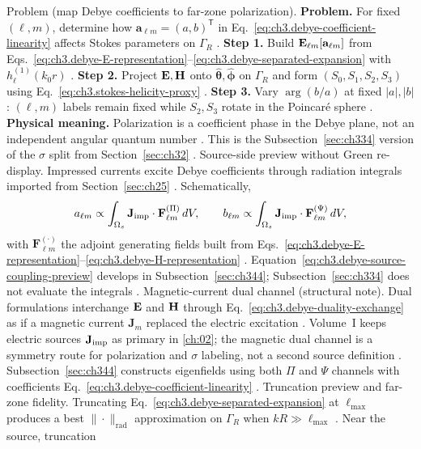 Problem (map Debye coefficients to far-zone polarization). \textbf{Problem.} For fixed \((\ell,m)\), determine how \(\mathbf{a}_{\ell m}=(a,b)^{\mathsf{T}}\) in
Eq.~\eqref{eq:ch3.debye-coefficient-linearity} affects Stokes parameters on \(\Gamma_R\) .
\textbf{Step 1.} Build \(\mathbf{E}_{\ell m}[\mathbf{a}_{\ell m}]\) from Eqs.~\eqref{eq:ch3.debye-E-representation}--\eqref{eq:ch3.debye-separated-expansion}
with \(h_{\ell}^{(1)}(k_{0}r)\) .
\textbf{Step 2.} Project \(\mathbf{E},\mathbf{H}\) onto \(\hat{\boldsymbol{\theta}},\hat{\boldsymbol{\phi}}\) on \(\Gamma_R\) and form
\((S_0,S_1,S_2,S_3)\) using Eq.~\eqref{eq:ch3.stokes-helicity-proxy} .
\textbf{Step 3.} Vary \(\arg(b/a)\) at fixed \(|a|,|b|\): \((\ell,m)\) labels remain fixed while \(S_2,S_3\) rotate in
the Poincar\'e sphere .
\textbf{Physical meaning.} Polarization is a coefficient phase in the Debye plane, not an independent angular quantum
number . This is the Subsection~\ref{sec:ch334} version of the \(\sigma\) split from
Section~\ref{sec:ch32} .
Source-side preview without Green re-display. Impressed currents excite Debye coefficients through radiation integrals imported from Section~\ref{sec:ch25}
. Schematically,
\begin{equation}
\label{eq:ch3.debye-source-coupling-preview}
a_{\ell m}
\propto
\int_{\Omega_s}
\mathbf{J}_{\mathrm{imp}}\cdot\mathbf{F}_{\ell m}^{(\Pi)}\,dV,
\qquad
b_{\ell m}
\propto
\int_{\Omega_s}
\mathbf{J}_{\mathrm{imp}}\cdot\mathbf{F}_{\ell m}^{(\Psi)}\,dV,
\end{equation}
with \(\mathbf{F}_{\ell m}^{(\cdot)}\) the adjoint generating fields built from
Eqs.~\eqref{eq:ch3.debye-E-representation}--\eqref{eq:ch3.debye-H-representation} .
Equation~\eqref{eq:ch3.debye-source-coupling-preview} develops in Subsection~\ref{sec:ch344}; Subsection~\ref{sec:ch334}
does not evaluate the integrals .
Magnetic-current dual channel (structural note). Dual formulations interchange \(\mathbf{E}\) and \(\mathbf{H}\) through Eq.~\eqref{eq:ch3.debye-duality-exchange} as if a magnetic
current \(\mathbf{J}_{m}\) replaced the electric excitation . Volume~I keeps electric
sources \(\mathbf{J}_{\mathrm{imp}}\) as primary in \ref{ch:02}; the magnetic dual channel is a symmetry route for
polarization and \(\sigma\) labeling, not a second source definition . Subsection~\ref{sec:ch344}
constructs eigenfields using both \(\Pi\) and \(\Psi\) channels with coefficients
Eq.~\eqref{eq:ch3.debye-coefficient-linearity} .
Truncation preview and far-zone fidelity. Truncating Eq.~\eqref{eq:ch3.debye-separated-expansion} at \(\ell_{\max}\) produces a best \(\|\cdot\|_{\mathrm{rad}}\)
approximation on \(\Gamma_R\) when \(kR\gg\ell_{\max}\) . Near the source, truncation
